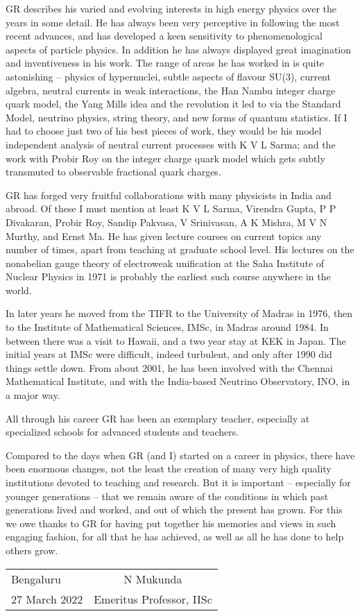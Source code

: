 GR describes his varied and evolving interests in high energy physics 
over the years in some detail. He has always been very perceptive in 
following the most recent advances, and has deve\-loped a keen 
sensitivity to phenomenological aspects of particle physics. In 
addition he has always displayed great imagination and inventiveness in 
his work. The range of areas\- he has worked in is quite astonishing – 
physics of hypernuclei, subtle aspects of flavour SU(3), current 
algebra, neutral currents in weak interactions, the Han Nambu integer 
charge quark model, the Yang Mills idea and the revolution it led to 
via the Standard Model, neutrino physics, string theory, and new forms 
of quantum statistics. If I had to choose just two of his best pieces 
of work, they would be his model independent analysis of neutral 
current processes with K V L Sarma; and the work with Probir Roy on 
the integer charge quark model which gets subtly transmuted to 
observable fractional quark charges.


GR has forged very fruitful collaborations with many physicists in 
India and abroad. Of these I must mention at least K V L Sarma, 
Virendra Gupta, P P Divakaran, Probir Roy, Sandip Pakvasa, V 
Srinivasan, A K Mishra, M V N Murthy, and Ernst Ma. He has given 
lecture courses on current topics any number of times, apart from 
teaching at graduate school level. His lectures on the nonabelian gauge 
theory of electroweak unification at the Saha Institute of Nuclear 
Physics in 1971 is probably the earliest such course anywhere in the 
world.


In later years he moved from the TIFR to the University of Madras in 
1976, then to the Institute of Mathematical Sciences, IMSc, in Madras 
around 1984. In between there was a visit to Hawaii, and a two year 
stay at KEK in Japan. The initial years at IMSc were difficult, indeed 
turbulent, and only after 1990 did things settle down. From about 2001, 
he has been involved with the Chennai Mathematical Institute, and with 
the India-based Neutrino Observatory, INO, in a major way.


All through his career GR has been an exemplary teacher, especia\-lly at 
specialized schools for advanced students and tea\-chers.  


Compared to the days when GR (and I) started on a career in physics, 
there have been enormous changes, not the least the crea\-tion of many 
very high quality institutions devoted to teaching and research. But it 
is important – especially for younger generations – that we remain 
aware of the conditions in which past generations lived and worked, 
and out of which the present has grown. For this we owe thanks to GR 
for having put together his memories and views in such engaging fashion, 
for all that he has achieved, as well as all he has done to help 
others grow.
\vskip 1cm

\begin{flushleft}
\begin{tabular}{l@{\phantom{WWWWWWWWW}}c}
Bengaluru & \quad N Mukunda\\
27 March 2022 & Emeritus Professor, IISc
\end{tabular}
\end{flushleft}
\label{endforeword}
